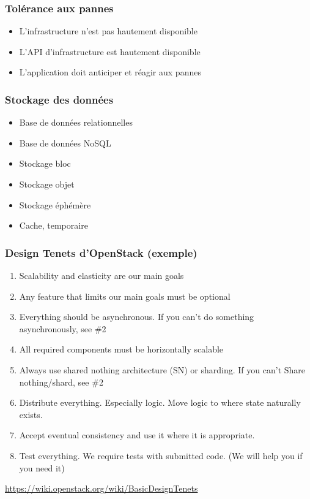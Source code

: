   \begin{frame}
    \frametitle{Tolérance aux pannes}
    \begin{itemize}
      \item L'infrastructure n'est pas hautement disponible
      \item L'API d'infrastructure est hautement disponible
      \item L'application doit anticiper et réagir aux pannes
    \end{itemize}
  \end{frame}

  \begin{frame}
    \frametitle{Stockage des données}
    \begin{itemize}
      \item Base de données relationnelles
      \item Base de données NoSQL
      \item Stockage bloc
      \item Stockage objet
      \item Stockage éphémère
      \item Cache, temporaire
    \end{itemize}
  \end{frame}

  \begin{frame}
    \frametitle{Design Tenets d'OpenStack (exemple)}
    \begin{enumerate}
      \item Scalability and elasticity are our main goals
      \item Any feature that limits our main goals must be optional
      \item Everything should be asynchronous. If you can't do something asynchronously, see \#2
      \item All required components must be horizontally scalable
      \item Always use shared nothing architecture (SN) or sharding. If you can't Share nothing/shard, see \#2
      \item Distribute everything. Especially logic. Move logic to where state naturally exists.
      \item Accept eventual consistency and use it where it is appropriate.
      \item Test everything. We require tests with submitted code. (We will help you if you need it)
    \end{enumerate}
    \url{https://wiki.openstack.org/wiki/BasicDesignTenets}
  \end{frame}


